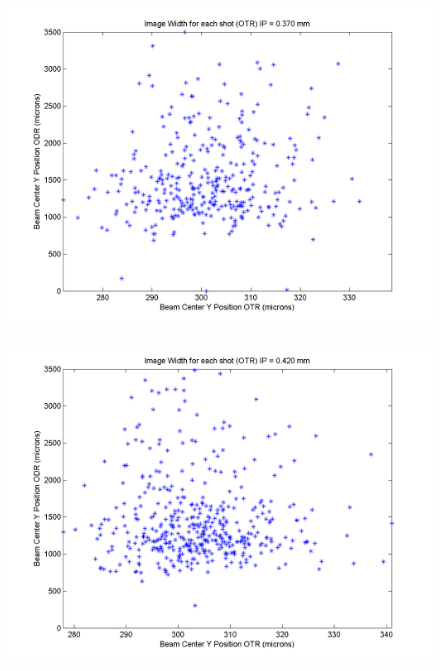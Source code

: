\documentclass[12pt]{article}
\begin{document}
\begin{figure}
\begin{center}
\includegraphics[scale=0.5]{Figures/YPosition_OTRODR_370.PNG}
\caption{}
\end{center}
\end{figure}

\begin{figure}
\begin{center}
\includegraphics[scale=0.5]{Figures/YPosition_OTRODR_420.PNG}
\caption{}
\end{center}
\end{figure}
\end{document}
